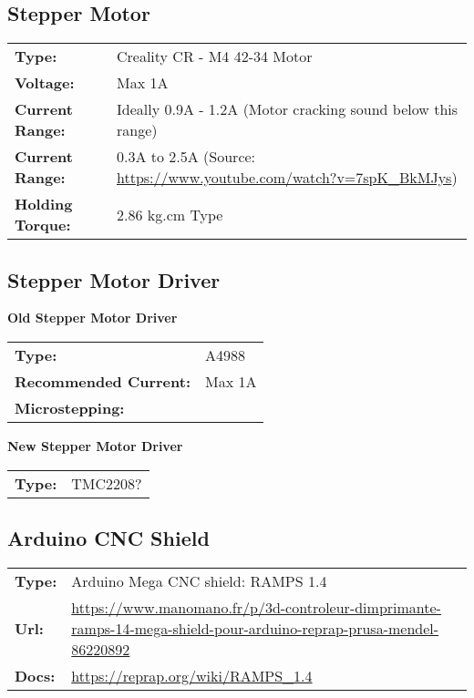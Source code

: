 \subsection{Stepper Motor}


\begin{tabular}{@{}ll}
    \textbf{Type:} & Creality CR - M4 42-34 Motor \\
    \textbf{Voltage:} & Max 1A \\
    \textbf{Current Range:} & Ideally 0.9A - 1.2A (Motor cracking sound below this range) \\
    \textbf{Current Range:} & 0.3A to 2.5A (Source: \url{https://www.youtube.com/watch?v=7spK_BkMJys}) \\
    \textbf{Holding Torque:} & 2.86 kg.cm Type \\
\end{tabular}


\subsection{Stepper Motor Driver}

\textbf{Old Stepper Motor Driver}

\begin{tabular}{@{}ll}
    \textbf{Type:} & A4988 \\
    \textbf{Recommended Current:} & Max 1A \\
    \textbf{Microstepping:} & \\
\end{tabular}

\noindent
\textbf{New Stepper Motor Driver}

\begin{tabular}{@{}ll}
    \textbf{Type:} & TMC2208? \\
\end{tabular}


\subsection{Arduino CNC Shield}

\begin{tabular}{@{}ll}
    \textbf{Type:} & Arduino Mega CNC shield: RAMPS 1.4  \\
    \textbf{Url:} & \url{https://www.manomano.fr/p/3d-controleur-dimprimante-ramps-14-mega-shield-pour-arduino-reprap-prusa-mendel-86220892} \\
    \textbf{Docs:} & \url{https://reprap.org/wiki/RAMPS_1.4}
\end{tabular}

